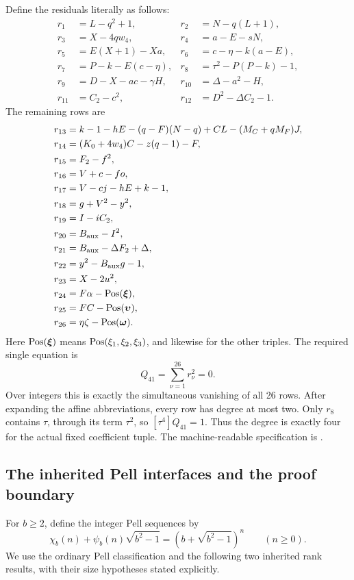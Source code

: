 Define the residuals literally as follows:
\begin{align*}
 r_1&=L-q^2+1, &
 r_2&=N-q(L+1),\\
 r_3&=X-4qw_4, &
 r_4&=a-E-sN,\\
 r_5&=E(X+1)-Xa, &
 r_6&=c-\eta-k(a-E),\\
 r_7&=P-k-E(c-\eta), &
 r_8&=\tau^2-P(P-k)-1,\\
 r_9&=D-X-ac-\gamma H, &
 r_{10}&=\Delta-a^2-H,\\
 r_{11}&=C_2-c^2, &
 r_{12}&=D^2-\Delta C_2-1.
\end{align*}
The remaining rows are
\begin{align*}
 r_{13}&=k-1-hE-(q-F)(N-q)+CL-(M_C+qM_F)J,\\
 r_{14}&=(K_0+4w_4)C-z(q-1)-F,\\
 r_{15}&=F_2-f^2,\\
 r_{16}&=V+c-fo,\\
 r_{17}&=V-cj-hE+k-1,\\
 r_{18}&=g+V^2-y^2,\\
 r_{19}&=I-iC_2,\\
 r_{20}&=B_{\mathrm{aux}}-I^2,\\
 r_{21}&=B_{\mathrm{aux}}-\Delta F_2+\Delta,\\
 r_{22}&=y^2-B_{\mathrm{aux}}g-1,\\
 r_{23}&=X-2u^2,\\
 r_{24}&=F\alpha-\operatorname{Pos}(\boldsymbol\xi),\\
 r_{25}&=FC-\operatorname{Pos}(\boldsymbol\upsilon),\\
 r_{26}&=\eta\zeta-\operatorname{Pos}(\boldsymbol\omega).
\end{align*}
Here \(\operatorname{Pos}(\boldsymbol\xi)\) means
\(\operatorname{Pos}(\xi_1,\xi_2,\xi_3)\), and likewise for the other triples.
The required single equation is
\[
 \boxed{\quad Q_{41}=\sum_{\nu=1}^{26}r_\nu^2=0.\quad}
\]
Over integers this is exactly the simultaneous vanishing of all 26 rows.
After expanding the affine abbreviations, every row has degree at most
two.  Only \(r_8\) contains \(\tau\), through its term \(\tau^2\), so
\([\tau^4]Q_{41}=1\).  Thus the degree is exactly four for the actual
fixed coefficient tuple.  The machine-readable specification is
.

\subsection{The inherited Pell interfaces and the proof boundary}

For \(b\geq2\), define the integer Pell sequences by
\[
 \chi_b(n)+\psi_b(n)\sqrt{b^2-1}
       =(b+\sqrt{b^2-1})^n\qquad(n\geq0).
\]
We use the ordinary Pell classification and the following two inherited
rank results, with their size hypotheses stated explicitly.

